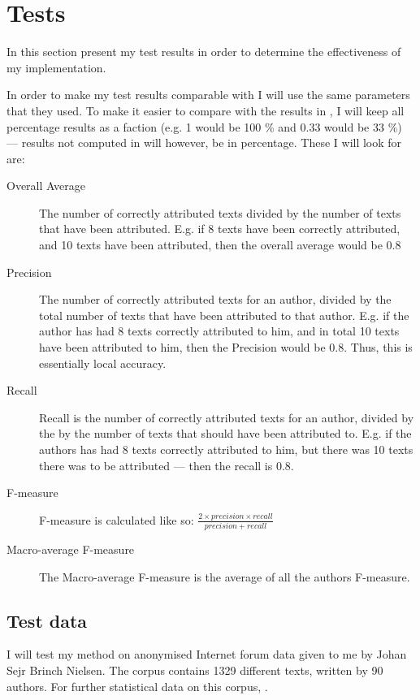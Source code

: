 \section{Tests}
\label{tests}

In this section present my test results in order to determine the effectiveness of my implementation.

In order to make my test results comparable with \cite{nr4} I will use the same parameters that they used. To make it easier to compare with the results in \cite{nr4}, I will keep all percentage results as a faction (e.g. 1 would be 100 \% and 0.33 would be 33 \%) --- results not computed in \cite{nr4} will however, be in percentage. These I will look for are: 

\begin{description}
\item[Overall Average] The number of correctly attributed texts divided by the number of texts that have been attributed. E.g. if 8 texts have been correctly attributed, and 10 texts have been attributed, then the overall average would be 0.8 

\item[Precision] The number of correctly attributed texts for an author, divided by the total number of texts that have been attributed to that author. E.g. if the author has had 8 texts correctly attributed to him, and in total 10 texts have been attributed to him, then the Precision would be 0.8. Thus, this is essentially local accuracy.

\item[Recall] Recall is the number of correctly attributed texts for an author, divided by the by the number of texts that should have been attributed to. E.g. if the authors has had 8 texts correctly attributed to him, but there was 10 texts there was to be attributed --- then the recall is 0.8.

\item[F-measure] F-measure is calculated like so: $\frac{2 \times precision \times recall}{precision+recall}$ 

\item[Macro-average F-measure] The Macro-average F-measure is the average of all the authors F-measure. 
\end{description}

\subsection{Test data}
I will test my method on anonymised Internet forum data given to me by Johan Sejr Brinch Nielsen. The corpus contains 1329 different texts, written by 90 authors. For further statistical data on this corpus, .  


